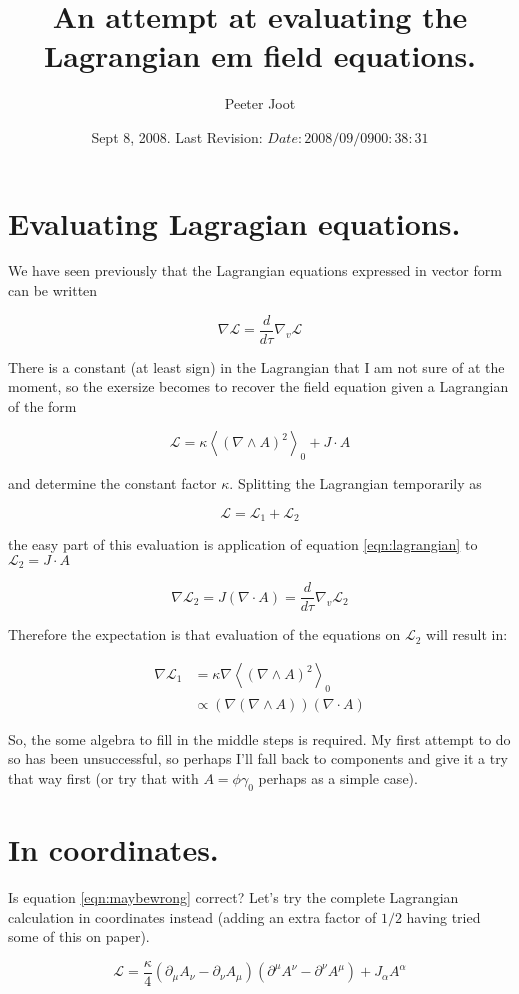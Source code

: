 \documentclass{article}
\title{ An attempt at evaluating the Lagrangian em field equations. }
\author{Peeter Joot}
\date{ Sept 8, 2008.  Last Revision: $Date: 2008/09/09 00:38:31 $ }
\newcommand{\LL}[0]{\mathcal{L}}
\newcommand{\gpgrade}[2] {{\left\langle{{#1}}\right\rangle}_{#2}}
\newcommand{\gpgradezero}[1] {\gpgrade{#1}{0}}
\newcommand{\grad}[0]{\nabla}
\begin{document}
\maketitle{}

\section{ Evaluating Lagragian equations. }

We have seen previously that the Lagrangian equations expressed in vector 
form can be written

\begin{equation}\label{eqn:lagrangian}
\grad \LL = \frac{d}{d\tau} \grad_v \LL
\end{equation}

There is a constant (at least sign) in the Lagrangian that I am not sure of
at the moment, so the exersize becomes to recover the field equation 
given a Lagrangian of the form

\begin{equation*}
\LL = \kappa \gpgradezero{ (\grad \wedge A)^2 } + J \cdot A
\end{equation*}

and determine the constant factor $\kappa$.  Splitting the Lagrangian temporarily as

\begin{equation*}
\LL = \LL_1 + \LL_2
\end{equation*}

the easy part of this evaluation is application of equation \ref{eqn:lagrangian} to $\LL_2 = J \cdot A$

\begin{equation}\label{eqn:maybewrong}
\grad \LL_2 = J (\grad \cdot A) = \frac{d}{d\tau} \grad_v \LL_2
\end{equation}

Therefore the expectation is that evaluation of the equations on $\LL_2$ will 
result in:

\begin{align*}
\grad \LL_1 
&= \kappa \grad \gpgradezero{ (\grad \wedge A)^2 } \\
&\propto (\grad (\grad \wedge A)) (\grad \cdot A)
\end{align*}

So, the some algebra to fill in the middle steps is required.  My
first attempt to do so has been unsuccessful, so perhaps I'll fall back
to components and give it a try that way first (or try that with $A = \phi \gamma_0$ perhaps as a simple case).

\section{ In coordinates. }

Is equation \ref{eqn:maybewrong} correct?  Let's try the complete Lagrangian calculation in coordinates instead (adding an extra factor of $1/2$
having tried some of this on paper).

\begin{equation*}
\LL = \frac{\kappa}{4} ( \partial_{\mu} A_{\nu} - \partial_{\nu} A_{\mu} ) ( \partial^{\mu} A^{\nu} - \partial^{\nu} A^{\mu} ) + J_{\alpha} A^{\alpha}
\end{equation*}
\end{document}
